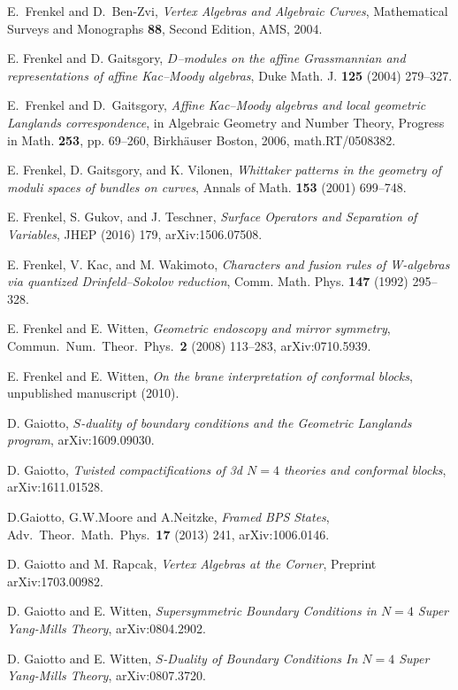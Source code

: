 \documentclass[11pt,reqno]{amsart}
\theoremstyle{plain}
\numberwithin{equation}{section}
\theoremstyle{definition}
\begin{document}
\begin{thebibliography}{AFO}
 E.~Frenkel and D.~Ben-Zvi, {\em Vertex Algebras and Algebraic
Curves}, Mathematical Surveys and Monographs {\bf 88}, Second Edition,
AMS, 2004.

 E. Frenkel and D. Gaitsgory, {\em $D$--modules on the affine
  Grassmannian and representations of affine Kac--Moody algebras}, Duke
Math. J. {\bf 125} (2004) 279--327.

 E.~Frenkel and D.~Gaitsgory, {\em Affine Kac--Moody algebras
  and local geometric Langlands correspondence}, in Algebraic Geometry
and Number Theory, Progress in Math. {\bf 253}, pp. 69--260,
Birkh\"auser Boston, 2006, math.RT/0508382.

 E. Frenkel, D. Gaitsgory, and K. Vilonen, {\em Whittaker
  patterns in the geometry of moduli spaces of bundles on curves},
Annals of Math. {\bf 153} (2001) 699--748.

 E. Frenkel, S. Gukov, and J. Teschner,
  {\em Surface Operators and Separation of Variables}, JHEP (2016) 179,
  arXiv:1506.07508.

 E. Frenkel, V. Kac, and M. Wakimoto, {\em Characters and
    fusion rules of W-algebras via quantized Drinfeld--Sokolov
    reduction}, Comm. Math. Phys. {\bf 147} (1992) 295--328.

 E. Frenkel and E. Witten,
  {\em Geometric endoscopy and mirror symmetry},
  Commun.\ Num.\ Theor.\ Phys.\  {\bf 2} (2008) 113--283,
  arXiv:0710.5939.

 E. Frenkel and E. Witten, {\em On the brane interpretation of
  conformal blocks}, unpublished manuscript (2010).
  
 D. Gaiotto, {\em $S$-duality of boundary conditions and the
  Geometric Langlands program}, arXiv:1609.09030.

 D. Gaiotto, {\em Twisted compactifications of 3d $N = 4$
  theories and conformal blocks}, arXiv:1611.01528.

  D.Gaiotto, G.W.Moore and A.Neitzke,
  {\em Framed BPS States},
  Adv.\ Theor.\ Math.\ Phys.\  {\bf 17} (2013) 241,
  arXiv:1006.0146.
  
 D. Gaiotto and M. Rapcak, {\em Vertex Algebras at the Corner},
Preprint arXiv:1703.00982.

 D. Gaiotto and E. Witten, {\em Supersymmetric
Boundary Conditions in $N=4$ Super Yang-Mills Theory},
arXiv:0804.2902.

 D. Gaiotto and E. Witten, {\em $S$-Duality of Boundary
Conditions In $N=4$ Super Yang-Mills Theory}, arXiv:0807.3720.


\end{thebibliography}
\end{document}

